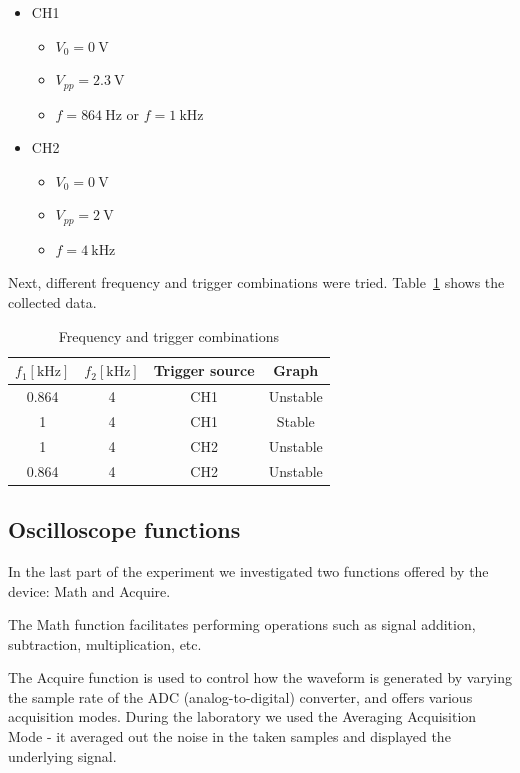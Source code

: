 \begin{itemize}
	\item CH1
	\begin{itemize}
		\item $V_{0} = \SI{0}{\volt}$
		\item $V_{pp} = \SI{2.3}{\volt}$
		\item $f = \SI{864}{\hertz}$ or $f = \SI{1}{\kilo\hertz}$
	\end{itemize}
	\item CH2
	\begin{itemize}
		\item $V_{0} = \SI{0}{\volt}$
		\item $V_{pp} = \SI{2}{\volt}$
		\item $f = \SI{4}{\kilo\hertz}$
	\end{itemize}
\end{itemize}

Next, different frequency and trigger combinations were tried. Table~\ref{tab:triggering} shows the collected data.

\begin{table}[H]
	\centering
	\begin{tabular}{c|c|c|c}
		$f_{1} [\unit{\kilo\hertz}]$ & $f_{2} [\unit{\kilo\hertz}]$ & Trigger source & Graph\\
		\hline
		0.864 & 4 & CH1 & Unstable\\
		\hline
		1 & 4 & CH1 & Stable\\
		\hline
		1 & 4 & CH2 & Unstable\\
		\hline
		0.864 & 4 & CH2 & Unstable\\
	\end{tabular}
	\caption{Frequency and trigger combinations}
	\label{tab:triggering}
\end{table}

\subsection{Oscilloscope functions}
In the last part of the experiment we investigated two functions offered by the device: Math and Acquire.

The Math function facilitates performing operations such as signal addition, subtraction, multiplication, etc.

The Acquire function is used to control how the waveform is generated by varying the sample rate of the ADC (analog-to-digital) converter, and offers various acquisition modes. During the laboratory we used the Averaging Acquisition Mode - it averaged out the noise in the taken samples and displayed the underlying signal.
